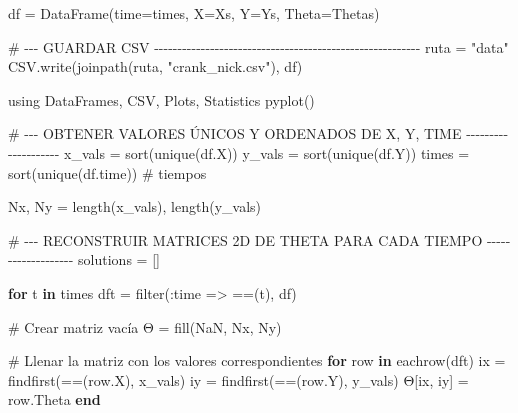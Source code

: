 \documentclass[
  spanish,
  us-letterpaper,
  DIV=11,
  numbers=noendperiod]{scrreprt}
\newenvironment{Shaded}{\begin{snugshade}}{\end{snugshade}}
\newcommand{\BuiltInTok}[1]{\textcolor[rgb]{0.00,0.23,0.31}{#1}}
\newcommand{\CommentTok}[1]{\textcolor[rgb]{0.37,0.37,0.37}{#1}}
\newcommand{\ConstantTok}[1]{\textcolor[rgb]{0.56,0.35,0.01}{#1}}
\newcommand{\ControlFlowTok}[1]{\textcolor[rgb]{0.00,0.23,0.31}{\textbf{#1}}}
\newcommand{\FunctionTok}[1]{\textcolor[rgb]{0.28,0.35,0.67}{#1}}
\newcommand{\ImportTok}[1]{\textcolor[rgb]{0.00,0.46,0.62}{#1}}
\newcommand{\KeywordTok}[1]{\textcolor[rgb]{0.00,0.23,0.31}{\textbf{#1}}}
\newcommand{\NormalTok}[1]{\textcolor[rgb]{0.00,0.23,0.31}{#1}}
\newcommand{\OperatorTok}[1]{\textcolor[rgb]{0.37,0.37,0.37}{#1}}
\newcommand{\StringTok}[1]{\textcolor[rgb]{0.13,0.47,0.30}{#1}}
\theoremstyle{plain}
\theoremstyle{definition}
\theoremstyle{remark}
\begin{document}
\begin{Shaded}
\begin{Highlighting}[]
\NormalTok{df }\OperatorTok{=} \FunctionTok{DataFrame}\NormalTok{(time}\OperatorTok{=}\NormalTok{times, X}\OperatorTok{=}\NormalTok{Xs, Y}\OperatorTok{=}\NormalTok{Ys, Theta}\OperatorTok{=}\NormalTok{Thetas)}

\CommentTok{\# {-}{-}{-} GUARDAR CSV {-}{-}{-}{-}{-}{-}{-}{-}{-}{-}{-}{-}{-}{-}{-}{-}{-}{-}{-}{-}{-}{-}{-}{-}{-}{-}{-}{-}{-}{-}{-}{-}{-}{-}{-}{-}{-}{-}{-}{-}{-}{-}{-}{-}{-}{-}{-}{-}{-}{-}{-}{-}{-}{-}{-}{-}{-}}
\NormalTok{ruta }\OperatorTok{=} \StringTok{"data"}
\NormalTok{CSV.}\FunctionTok{write}\NormalTok{(}\FunctionTok{joinpath}\NormalTok{(ruta, }\StringTok{"crank\_nick.csv"}\NormalTok{), df)}
\end{Highlighting}
\end{Shaded}

\begin{Shaded}
\begin{Highlighting}[]
\ImportTok{using} \BuiltInTok{DataFrames}\NormalTok{, }\BuiltInTok{CSV}\NormalTok{, }\BuiltInTok{Plots}\NormalTok{, }\BuiltInTok{Statistics}
\FunctionTok{pyplot}\NormalTok{()}

\CommentTok{\# {-}{-}{-} OBTENER VALORES ÚNICOS Y ORDENADOS DE X, Y, TIME {-}{-}{-}{-}{-}{-}{-}{-}{-}{-}{-}{-}{-}{-}{-}{-}{-}{-}{-}{-}}
\NormalTok{x\_vals }\OperatorTok{=} \FunctionTok{sort}\NormalTok{(}\FunctionTok{unique}\NormalTok{(df.X))}
\NormalTok{y\_vals }\OperatorTok{=} \FunctionTok{sort}\NormalTok{(}\FunctionTok{unique}\NormalTok{(df.Y))}
\NormalTok{times }\OperatorTok{=} \FunctionTok{sort}\NormalTok{(}\FunctionTok{unique}\NormalTok{(df.time))  }\CommentTok{\# tiempos}

\NormalTok{Nx, Ny }\OperatorTok{=} \FunctionTok{length}\NormalTok{(x\_vals), }\FunctionTok{length}\NormalTok{(y\_vals)}

\CommentTok{\# {-}{-}{-} RECONSTRUIR MATRICES 2D DE THETA PARA CADA TIEMPO {-}{-}{-}{-}{-}{-}{-}{-}{-}{-}{-}{-}{-}{-}{-}{-}{-}{-}{-}}
\NormalTok{solutions }\OperatorTok{=}\NormalTok{ []}

\ControlFlowTok{for}\NormalTok{ t }\KeywordTok{in}\NormalTok{ times}
\NormalTok{    dft }\OperatorTok{=} \FunctionTok{filter}\NormalTok{(}\OperatorTok{:}\NormalTok{time }\OperatorTok{=\textgreater{}} \OperatorTok{==}\NormalTok{(t), df)}

    \CommentTok{\# Crear matriz vacía}
\NormalTok{    Θ }\OperatorTok{=} \FunctionTok{fill}\NormalTok{(}\ConstantTok{NaN}\NormalTok{, Nx, Ny)}

    \CommentTok{\# Llenar la matriz con los valores correspondientes}
    \ControlFlowTok{for}\NormalTok{ row }\KeywordTok{in} \FunctionTok{eachrow}\NormalTok{(dft)}
\NormalTok{        ix }\OperatorTok{=} \FunctionTok{findfirst}\NormalTok{(}\OperatorTok{==}\NormalTok{(row.X), x\_vals)}
\NormalTok{        iy }\OperatorTok{=} \FunctionTok{findfirst}\NormalTok{(}\OperatorTok{==}\NormalTok{(row.Y), y\_vals)}
\NormalTok{        Θ[ix, iy] }\OperatorTok{=}\NormalTok{ row.Theta}
    \ControlFlowTok{end}


\end{Highlighting}
\end{Shaded}
\end{document}
